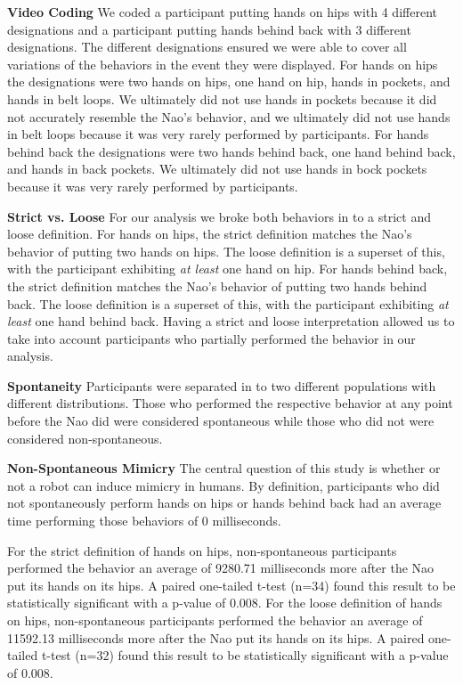 \documentclass{acm_proc_article-sp}
\begin{document}
\textbf{Video Coding} We coded a participant putting hands on hips with 4 different designations and a participant putting hands behind back with 3 different designations. The different designations ensured we were able to cover all variations of the behaviors in the event they were displayed. For hands on hips the designations were two hands on hips, one hand on hip, hands in pockets, and hands in belt loops. We ultimately did not use hands in pockets because it did not accurately resemble the Nao's behavior, and we ultimately did not use hands in belt loops because it was very rarely performed by participants. For hands behind back the designations were two hands behind back, one hand behind back, and hands in back pockets. We ultimately did not use hands in bock pockets because it was very rarely performed by participants.
	
\textbf{Strict vs. Loose} For our analysis we broke both behaviors in to a strict and loose definition. For hands on hips, the strict definition matches the Nao's behavior of putting two hands on hips. The loose definition is a superset of this, with the participant exhibiting \textit{at least} one hand on hip. For hands behind back, the strict definition matches the Nao's behavior of putting two hands behind back. The loose definition is a superset of this, with the participant exhibiting \textit{at least} one hand behind back. Having a strict and loose interpretation allowed us to take into account participants who partially performed the behavior in our analysis. 

\textbf{Spontaneity} Participants were separated in to two different populations with different distributions. Those who performed the respective behavior at any point before the Nao did were considered spontaneous while those who did not were considered non-spontaneous.

\textbf{Non-Spontaneous Mimicry} The central question of this study is whether or not a robot can induce mimicry in humans. By definition, participants who did not spontaneously perform hands on hips or hands behind back had an average time performing those behaviors of 0 milliseconds. 

For the strict definition of hands on hips, non-spontaneous participants performed the behavior an average of 9280.71 milliseconds more after the Nao put its hands on its hips. A paired one-tailed t-test (n=34) found this result to be statistically significant with a p-value of 0.008. For the loose definition of hands on hips, non-spontaneous participants performed the behavior an average of 11592.13 milliseconds more after the Nao put its hands on its hips. A paired one-tailed t-test (n=32) found this result to be statistically significant with a p-value of 0.008. 
\end{document}
